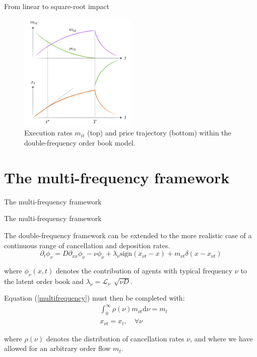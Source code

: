 \documentclass{beamer}
\begin{document}
\begin{frame}{From linear to square-root impact}

\begin{figure}
\centering
\includegraphics[width=0.5\textwidth]{figure4.PNG}
\caption{\label{fig:f4}Execution rates $m_{it}$ (top) and price trajectory (bottom) within the double-frequency order book model.}
\end{figure}

\end{frame}

\section{The multi-frequency framework}

\begin{frame}{The multi-frequency framework}
  \tableofcontents[currentsection]
\end{frame}

\begin{frame}{The multi-frequency framework}

The double-frequency framework can be extended to the more realistic case of a continuous range of cancellation and deposition rates. 
\begin{equation}\label{multifrequency}
\partial_t{\phi_{\nu}} = D\partial_{xx}{\phi_{\nu}} - \nu \phi_{\nu} + \lambda_{\nu} \text{sign}(x_{\nu t}-x) + m_{\nu t}\delta(x - x_{\nu t})
\end{equation}

where $\phi_{\nu}(x,t)$ denotes the contribution of agents with typical frequency $\nu$ to the latent order book and $\lambda_{\nu} = \mathcal{L}_{\nu}\,\sqrt[]{\nu D}$. \newline 
 
Equation (\ref{multifrequency}) must then be completed with:
\begin{equation}
\begin{split}
&\int_0^{\infty}{\rho(\nu) m_{\nu t} \text{d}\nu} = m_t \\
&x_{\nu t} = x_t, \quad \forall \nu
\end{split}
\end{equation}

where $\rho(\nu)$ denotes the distribution of cancellation rates $\nu$, and where we have allowed for an arbitrary order flow $m_t$.

\end{frame}
\end{document}

